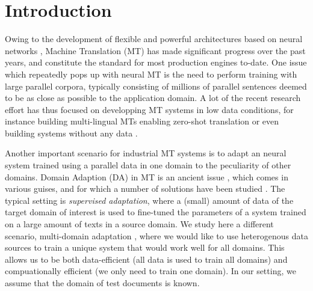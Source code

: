 \documentclass[11pt,a4paper]{article}
\begin{document}
\section{Introduction \label{sec:introduction}}
Owing to the development of flexible and powerful architectures based on neural networks \cite{bahdanau2014neural,Vaswani17attention}, Machine Translation (MT) has made significant progress over the past years, and constitute the standard for most production engines to-date. One issue which repeatedly pops up with neural MT is the need to perform training with large parallel corpora, typically consisting of millions of parallel sentences deemed to be as close as possible to the application domain. A lot of the recent research effort has thus focused on developping MT systems in low data conditions, for instance building multi-lingual MTs enabling zero-shot translation\cite{} or even building systems without any data \cite{}.

Another important scenario for industrial MT systems is to adapt an neural system trained using a parallel data in one  domain to the peculiarity of other domains. Domain Adaption (DA) in MT is an ancient issue \cite{Foster07mixture,Axelrod11domain}, which comes in various guises, and for which a number of solutions have been studied \cite{Chu18asurvey}. The typical setting is \emph{supervised adaptation}, where a (small) amount of data of the target domain of interest is used to fine-tuned the parameters of a system trained on a large amount of texts in a source domain. We study here a different scenario, multi-domain adaptation \cite{Farajian17multidomain}, where we would like to use heterogenous data sources to train a unique system that would work well for all domains. This allows us to be both data-efficient (all data is used to train all domains) and compuationally efficient (we only need to train one domain). In our setting, we assume that the domain of test documents is known.
\end{document}
